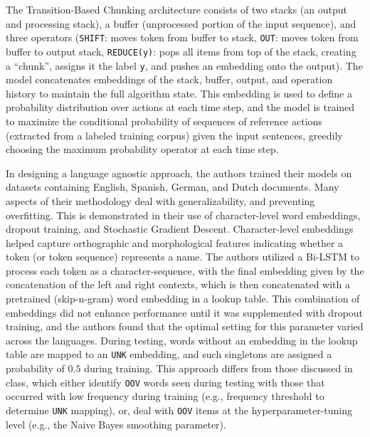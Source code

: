 \documentclass[11pt]{article}
\begin{document}

The Transition-Based Chunking architecture
consists of two stacks (an output 
and processing stack), 
a buffer (unprocessed
portion of the input sequence), and three
operators (\texttt{SHIFT}: moves token from
buffer to stack, \texttt{OUT}: moves token from buffer 
to output stack, \texttt{REDUCE(y)}: pops all items from
top of the stack, creating a “chunk”, assigns it the label \texttt{y}, 
and pushes an embedding onto the output). 
The model concatenates embeddings of 
the stack, buffer, output, 
and operation history to maintain
the full algorithm state.
This embedding is used to define a 
probability distribution over actions 
at each time step, and the model is trained 
to maximize the conditional probability of
sequences of reference actions 
(extracted from a labeled training corpus) 
given the input sentences, greedily choosing
the maximum probability operator at each time step. 



In designing a language agnostic approach,
the authors trained their models on datasets 
containing English, Spanish, 
German, and Dutch documents. Many aspects
of their methodology deal with generalizability, 
and preventing overfitting. This is demonstrated 
in their use of character-level word embeddings, 
dropout training,
and Stochastic Gradient Descent.
Character-level embeddings helped capture 
orthographic and morphological features 
indicating whether a token (or token sequence) 
represents a name.
The authors utilized a Bi-LSTM
to process each token as a character-sequence,
with the final embedding given by the concatenation 
of the left and right contexts, which is then 
concatenated with a pretrained (skip-n-gram) 
word embedding in a lookup table.
This combination of embeddings did not enhance 
performance until it was supplemented with dropout 
training, and the authors found that the optimal
setting for this parameter varied across the languages.
During testing, 
words without an embedding in the
lookup table are mapped to an \texttt{UNK}
embedding, and such singletons
are assigned a probability of $0.5$ during training.
This approach differs from those discussed in
class, which either identify \texttt{OOV} words seen
during testing with those that occurred
with low frequency during training (e.g., frequency threshold
to determine \texttt{UNK} mapping), 
or, deal with \texttt{OOV} items at the hyperparameter-tuning level 
(e.g., the Naive Bayes smoothing parameter).
\end{document}
